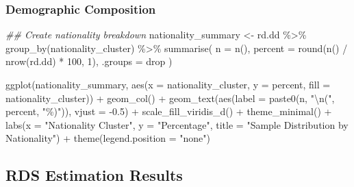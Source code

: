 \documentclass[
  12pt,
  letterpaper,
  DIV=11,
  numbers=noendperiod]{scrartcl}
\newenvironment{Shaded}{\begin{snugshade}}{\end{snugshade}}
\newcommand{\AttributeTok}[1]{\textcolor[rgb]{0.40,0.45,0.13}{#1}}
\newcommand{\DecValTok}[1]{\textcolor[rgb]{0.68,0.00,0.00}{#1}}
\newcommand{\DocumentationTok}[1]{\textcolor[rgb]{0.37,0.37,0.37}{\textit{#1}}}
\newcommand{\FloatTok}[1]{\textcolor[rgb]{0.68,0.00,0.00}{#1}}
\newcommand{\FunctionTok}[1]{\textcolor[rgb]{0.28,0.35,0.67}{#1}}
\newcommand{\NormalTok}[1]{\textcolor[rgb]{0.00,0.23,0.31}{#1}}
\newcommand{\OtherTok}[1]{\textcolor[rgb]{0.00,0.23,0.31}{#1}}
\newcommand{\SpecialCharTok}[1]{\textcolor[rgb]{0.37,0.37,0.37}{#1}}
\newcommand{\StringTok}[1]{\textcolor[rgb]{0.13,0.47,0.30}{#1}}
\theoremstyle{plain}
\theoremstyle{definition}
\begin{document}
\subsubsection{Demographic Composition}\label{demographic-composition}

\begin{Shaded}
\begin{Highlighting}[]
\DocumentationTok{\#\# Create nationality breakdown}
\NormalTok{nationality\_summary }\OtherTok{\textless{}{-}}\NormalTok{ rd.dd }\SpecialCharTok{\%\textgreater{}\%}
  \FunctionTok{group\_by}\NormalTok{(nationality\_cluster) }\SpecialCharTok{\%\textgreater{}\%}
  \FunctionTok{summarise}\NormalTok{(}
    \AttributeTok{n =} \FunctionTok{n}\NormalTok{(),}
    \AttributeTok{percent =} \FunctionTok{round}\NormalTok{(}\FunctionTok{n}\NormalTok{() }\SpecialCharTok{/} \FunctionTok{nrow}\NormalTok{(rd.dd) }\SpecialCharTok{*} \DecValTok{100}\NormalTok{, }\DecValTok{1}\NormalTok{),}
    \AttributeTok{.groups =} \StringTok{\textquotesingle{}drop\textquotesingle{}}
\NormalTok{  )}

\FunctionTok{ggplot}\NormalTok{(nationality\_summary, }\FunctionTok{aes}\NormalTok{(}\AttributeTok{x =}\NormalTok{ nationality\_cluster, }\AttributeTok{y =}\NormalTok{ percent, }\AttributeTok{fill =}\NormalTok{ nationality\_cluster)) }\SpecialCharTok{+}
  \FunctionTok{geom\_col}\NormalTok{() }\SpecialCharTok{+}
  \FunctionTok{geom\_text}\NormalTok{(}\FunctionTok{aes}\NormalTok{(}\AttributeTok{label =} \FunctionTok{paste0}\NormalTok{(n, }\StringTok{"}\SpecialCharTok{\textbackslash{}n}\StringTok{("}\NormalTok{, percent, }\StringTok{"\%)"}\NormalTok{)), }\AttributeTok{vjust =} \SpecialCharTok{{-}}\FloatTok{0.5}\NormalTok{) }\SpecialCharTok{+}
  \FunctionTok{scale\_fill\_viridis\_d}\NormalTok{() }\SpecialCharTok{+}
  \FunctionTok{theme\_minimal}\NormalTok{() }\SpecialCharTok{+}
  \FunctionTok{labs}\NormalTok{(}\AttributeTok{x =} \StringTok{"Nationality Cluster"}\NormalTok{, }\AttributeTok{y =} \StringTok{"Percentage"}\NormalTok{, }
       \AttributeTok{title =} \StringTok{"Sample Distribution by Nationality"}\NormalTok{) }\SpecialCharTok{+}
  \FunctionTok{theme}\NormalTok{(}\AttributeTok{legend.position =} \StringTok{"none"}\NormalTok{)}
\end{Highlighting}
\end{Shaded}

\subsection{RDS Estimation Results}\label{rds-estimation-results}
\end{document}
